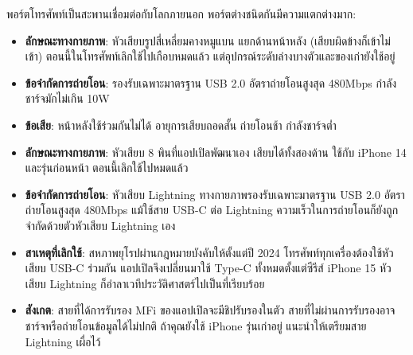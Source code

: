 พอร์ตโทรศัพท์เป็นสะพานเชื่อมต่อกับโลกภายนอก พอร์ตต่างชนิดกันมีความแตกต่างมาก:


\begin{itemize}
  \item \textbf{ลักษณะทางกายภาพ}: หัวเสียบรูปสี่เหลี่ยมคางหมูแบน แยกด้านหน้าหลัง (เสียบผิดข้างก็เข้าไม่เข้า) ตอนนี้ในโทรศัพท์เลิกใช้ไปเกือบหมดแล้ว แต่อุปกรณ์ระดับล่างบางตัวและของเก่ายังใช้อยู่
  \item \textbf{ข้อจำกัดการถ่ายโอน}: รองรับเฉพาะมาตรฐาน USB 2.0 อัตราถ่ายโอนสูงสุด 480Mbps กำลังชาร์จมักไม่เกิน 10W
  \item \textbf{ข้อเสีย}: หน้าหลังใช้ร่วมกันไม่ได้ อายุการเสียบถอดสั้น ถ่ายโอนช้า กำลังชาร์จต่ำ
\end{itemize}


\begin{itemize}
  \item \textbf{ลักษณะทางกายภาพ}: หัวเสียบ 8 พินที่แอปเปิลพัฒนาเอง เสียบได้ทั้งสองด้าน ใช้กับ iPhone 14 และรุ่นก่อนหน้า ตอนนี้เลิกใช้ไปหมดแล้ว
  \item \textbf{ข้อจำกัดการถ่ายโอน}: หัวเสียบ Lightning ทางกายภาพรองรับเฉพาะมาตรฐาน USB 2.0 อัตราถ่ายโอนสูงสุด 480Mbps แม้ใช้สาย USB-C ต่อ Lightning ความเร็วในการถ่ายโอนก็ยังถูกจำกัดด้วยตัวหัวเสียบ Lightning เอง
  \item \textbf{สาเหตุที่เลิกใช้}: สหภาพยุโรปผ่านกฎหมายบังคับให้ตั้งแต่ปี 2024 โทรศัพท์ทุกเครื่องต้องใช้หัวเสียบ USB-C ร่วมกัน แอปเปิลจึงเปลี่ยนมาใช้ Type-C ทั้งหมดตั้งแต่ซีรีส์ iPhone 15 หัวเสียบ Lightning ก็อำลาเวทีประวัติศาสตร์ไปเป็นที่เรียบร้อย
  \item \textbf{สังเกต}: สายที่ได้การรับรอง MFi ของแอปเปิลจะมีชิปรับรองในตัว สายที่ไม่ผ่านการรับรองอาจชาร์จหรือถ่ายโอนข้อมูลได้ไม่ปกติ ถ้าคุณยังใช้ iPhone รุ่นเก่าอยู่ แนะนำให้เตรียมสาย Lightning เผื่อไว้
\end{itemize}


